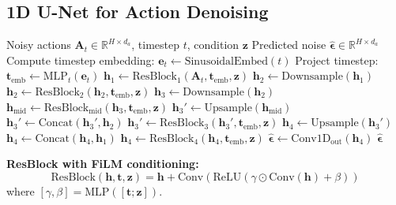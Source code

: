 \subsection{1D U-Net for Action Denoising}
\label{subsec:unet_algorithm}

\begin{algorithm}[H]
\caption{1D U-Net Forward Pass (Simplified)}
\label{alg:unet_forward}
\begin{algorithmic}[1]
\REQUIRE Noisy actions $\mathbf{A}_t \in \mathbb{R}^{H \times d_a}$, timestep $t$, condition $\mathbf{z}$
\ENSURE Predicted noise $\hat{\boldsymbol{\epsilon}} \in \mathbb{R}^{H \times d_a}$
\STATE Compute timestep embedding: $\mathbf{e}_t \gets \text{SinusoidalEmbed}(t)$
\STATE Project timestep: $\mathbf{t}_{\text{emb}} \gets \text{MLP}_t(\mathbf{e}_t)$
\STATE
{}
\STATE $\mathbf{h}_1 \gets \text{ResBlock}_1(\mathbf{A}_t, \mathbf{t}_{\text{emb}}, \mathbf{z})$ 
\STATE $\mathbf{h}_2 \gets \text{Downsample}(\mathbf{h}_1)$ 
\STATE $\mathbf{h}_2 \gets \text{ResBlock}_2(\mathbf{h}_2, \mathbf{t}_{\text{emb}}, \mathbf{z})$ 
\STATE $\mathbf{h}_3 \gets \text{Downsample}(\mathbf{h}_2)$ 
\STATE
{}
\STATE $\mathbf{h}_{\text{mid}} \gets \text{ResBlock}_{\text{mid}}(\mathbf{h}_3, \mathbf{t}_{\text{emb}}, \mathbf{z})$
\STATE
{}
\STATE $\mathbf{h}_3' \gets \text{Upsample}(\mathbf{h}_{\text{mid}})$ 
\STATE $\mathbf{h}_3' \gets \text{Concat}(\mathbf{h}_3', \mathbf{h}_2)$ 
\STATE $\mathbf{h}_3' \gets \text{ResBlock}_3(\mathbf{h}_3', \mathbf{t}_{\text{emb}}, \mathbf{z})$
\STATE $\mathbf{h}_4 \gets \text{Upsample}(\mathbf{h}_3')$ 
\STATE $\mathbf{h}_4 \gets \text{Concat}(\mathbf{h}_4, \mathbf{h}_1)$ 
\STATE $\mathbf{h}_4 \gets \text{ResBlock}_4(\mathbf{h}_4, \mathbf{t}_{\text{emb}}, \mathbf{z})$
\STATE
{}
\STATE $\hat{\boldsymbol{\epsilon}} \gets \text{Conv1D}_{\text{out}}(\mathbf{h}_4)$ 
\RETURN $\hat{\boldsymbol{\epsilon}}$
\end{algorithmic}
\end{algorithm}

\textbf{ResBlock with FiLM conditioning:}
\begin{equation}
\text{ResBlock}(\mathbf{h}, \mathbf{t}, \mathbf{z}) = \mathbf{h} + \text{Conv}(\text{ReLU}(\gamma \odot \text{Conv}(\mathbf{h}) + \beta))
\label{eq:resblock_film}
\end{equation}
where $[\gamma, \beta] = \text{MLP}([\mathbf{t}; \mathbf{z}])$.

